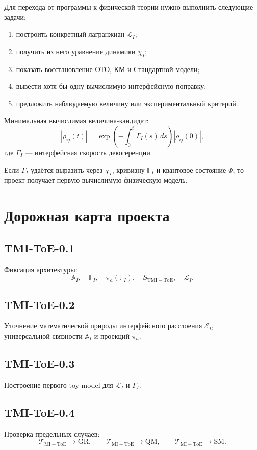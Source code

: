 \documentclass[12pt,a4paper]{article}
\newcommand{\TOE}{\mathcal T_{\mathrm{MI-ToE}}}
\newcommand{\EI}{\mathcal E_I}
\newcommand{\AI}{\mathbb A_I}
\newcommand{\FI}{\mathbb F_I}
\newcommand{\Lag}{\mathcal L}
\newcommand{\SM}{\mathrm{SM}}
\newcommand{\GR}{\mathrm{GR}}
\newcommand{\dd}{\,d}
\begin{document}
Для перехода от программы к физической теории нужно выполнить следующие задачи:
\begin{enumerate}[leftmargin=2.2em]
\item построить конкретный лагранжиан \(\Lag_I\);
\item получить из него уравнение динамики \(\chi_I\);
\item показать восстановление ОТО, КМ и Стандартной модели;
\item вывести хотя бы одну вычислимую интерфейсную поправку;
\item предложить наблюдаемую величину или экспериментальный критерий.
\end{enumerate}

Минимальная вычислимая величина-кандидат:
\[
\boxed{
|\rho_{ij}(t)|
=
\exp\left(-\int_0^t\Gamma_I(s)\dd s\right)
|\rho_{ij}(0)|,
}
\]
где \(\Gamma_I\) --- интерфейсная скорость декогеренции.

Если \(\Gamma_I\) удаётся выразить через \(\chi_I\), кривизну \(\FI\) и квантовое состояние \(\Psi\), то проект получает первую вычислимую физическую модель.

\section{Дорожная карта проекта}

\subsection*{TMI-ToE-0.1}
Фиксация архитектуры:
\[
\AI,
\quad
\FI,
\quad
\pi_a(\FI),
\quad
S_{\mathrm{TMI-ToE}},
\quad
\Lag_I.
\]

\subsection*{TMI-ToE-0.2}
Уточнение математической природы интерфейсного расслоения \(\EI\), универсальной связности \(\AI\) и проекций \(\pi_a\).

\subsection*{TMI-ToE-0.3}
Построение первого toy model для \(\Lag_I\) и \(\Gamma_I\).

\subsection*{TMI-ToE-0.4}
Проверка предельных случаев:
\[
\TOE\to \GR,
\qquad
\TOE\to \mathrm{QM},
\qquad
\TOE\to \SM.
\]
\end{document}
